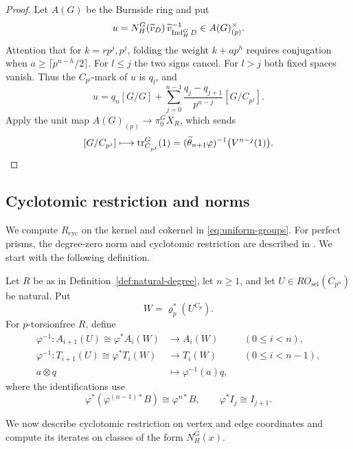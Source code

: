 \begin{proof}
Let $A(G)$ be the Burnside ring and put
\[
u=N_H^G(\widetilde v_D)\,
\widetilde v_{\operatorname{Ind}_H^G D}^{-1}\in A(G)_{(p)}^\times.
\]
Attention that for $k=rp^j,p^j$, folding the weight $k+ap^h$ requires conjugation
when $a\ge\lceil p^{n-h}/2\rceil$. For $l\le j$ the two signs
cancel. For $l>j$ both fixed spaces vanish. Thus the $C_{p^l}$-mark
of $u$ is $q_l$, and
\[
u=q_n[G/G]+\sum_{j=0}^{n-1}
\frac{q_j-q_{j+1}}{p^{n-j}}[G/C_{p^j}].
\]
Apply the unit map $A(G)_{(p)}\to\pi_0^G X_R$, which sends
\[
[G/C_{p^j}]\longmapsto\operatorname{tr}_{C_{p^j}}^G(1)
=(\widetilde\theta_{n+1}\varphi)^{-1}\bigl(V^{n-j}(1)\bigr).\qedhere
\]
\end{proof}

\subsection{Cyclotomic restriction and norms}\label{subsec:cyclotomic-maps}

We compute $R_{\mathrm{cyc}}$ on the kernel and cokernel in
\eqref{eq:uniform-groups}.
For perfect prisms, the degree-zero norm and cyclotomic restriction
are described in \cite[Section~3.1]{SulymaPrisms}. We start with the following definition.

\begin{definition}\label{def:cyclotomic-coefficients}
Let $R$ be as in Definition~\ref{def:natural-degree}, let $n\ge1$,
and let $U\in RO_{\mathrm{sel}}(C_{p^n})$ be natural. Put
\[
W=\varrho_p^*(U^{C_p}).
\]
For $p$-torsionfree $R$, define
\[
\begin{aligned}
\varphi^{-1}:A_{i+1}(U)\cong\varphi^*A_i(W)
&\longrightarrow A_i(W)
&& (0\le i<n),\\
\varphi^{-1}:T_{i+1}(U)\cong\varphi^*T_i(W)
&\longrightarrow T_i(W)
&& (0\le i<n-1),\\
a\otimes q&\longmapsto\varphi^{-1}(a)q,
\end{aligned}
\]
where the identifications use
\[
\varphi^*(\varphi^{(n-1)*}B)\cong\varphi^{n*}B,
\qquad
\varphi^*I_j\cong I_{j+1}.
\]
\end{definition}

We now describe cyclotomic restriction on vertex and edge coordinates
and compute its iterates on classes of the form $N_H^G(x)$.

